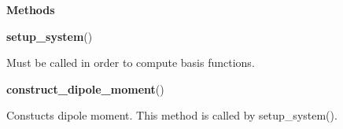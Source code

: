 \begin{tcolorbox}
{    \vspace{1em}
    \textbf{Methods}

    \hspace{2em} \textbf{setup\_system}()
        \begin{adjustwidth}{4em}{}
        Must be called in order to compute basis functions.
        \end{adjustwidth}

    \hspace{2em} \textbf{construct\_dipole\_moment}()
        \begin{adjustwidth}{4em}{}
        Constucts dipole moment. This method is called by setup\_system().
        \end{adjustwidth}
    }
\end{tcolorbox}
